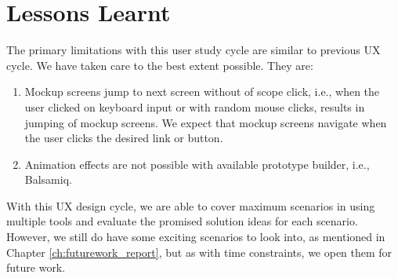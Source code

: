 \section{Lessons Learnt}

The primary limitations with this user study cycle are similar to previous UX cycle. We have taken care to the best extent possible. They are: \\

\begin{enumerate}
\item Mockup screens jump to next screen without of scope click, i.e., when the user clicked on keyboard input or with random mouse clicks, results in jumping of mockup screens. We expect that mockup screens navigate when the user clicks the desired link or button.
\item Animation effects are not possible with available prototype builder, i.e., Balsamiq.
\end{enumerate}

With this UX design cycle, we are able to cover maximum scenarios in using multiple tools and evaluate the promised solution ideas for each scenario. However, we still do have some exciting scenarios to look into, as mentioned in Chapter \ref{ch:futurework_report}, but as with time constraints, we open them for future work.
